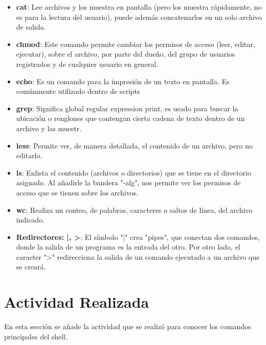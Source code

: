\documentclass[a4paper]{article}
\begin{document}
\begin{itemize}
\item \textbf{cat}: Lee archivos y los muestra en pantalla (pero los muestra rápidamente, no es para la lectura del usuario), puede además concatenarlos en un solo archivo de salida. 
\item \textbf{chmod}: Este comando permite cambiar los permisos de acceso (leer, editar, ejecutar), sobre el archivo, por parte del dueño, del grupo de usuarios registrados y de cualquier usuario en general.
\item \textbf{echo}: Es un comando para la impresión de un texto en pantalla. Es comúnmente utilizado dentro de scripts
\item\textbf{grep}: Significa global regular expression print, es usado para buscar la ubicación o renglones que contengan cierta cadena de texto dentro de un archivo y las muestr. 
\item \textbf{less}: Permite ver, de manera detallada, el contenido de un archivo, pero no editarlo. 
\item \textbf{ls}: Enlista el contenido (archivos o directorios) que se tiene en el directorio asignado. Al añadirle la bandera "-alg", nos permite ver los permisos de acceso que se tienen sobre los archivos. 
\item \textbf{wc}: Realiza un conteo, de palabras, caracteres o saltos de línea, del archivo indicado. 
\item \textbf{Redirectores: |, >}: El símbolo "|" crea "pipes", que conectan dos comandos, donde la salida de un programa es la entrada del otro. Por otro lado, el caracter ">" redirecciona la salida de un comando ejecutado a un archivo que se creará. 
\end{itemize}


\section{Actividad Realizada}

En esta sección se añade la actividad que se realizó para conocer los comandos principales del shell. 
\end{document}
